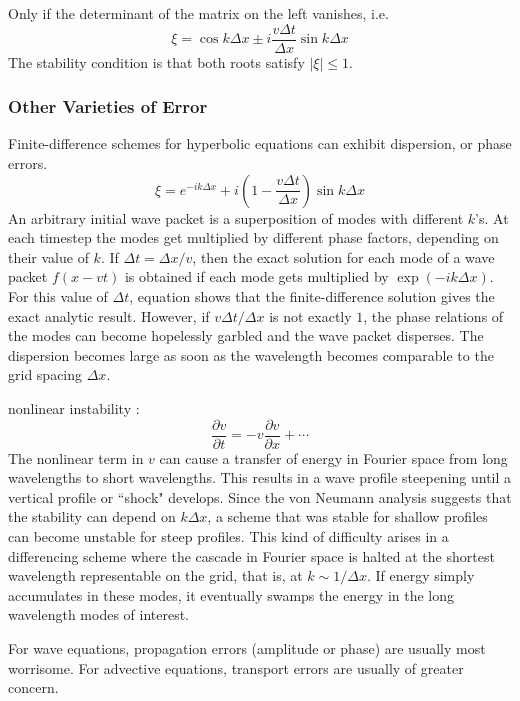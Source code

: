 \documentclass[12pt,a4paper]{article}
\begin{document}
Only if the determinant of the matrix on the left vanishes, i.e.
\begin{equation}
\xi = \cos k\Delta x \pm i \dfrac{v\Delta t }{\Delta x} \sin k\Delta x 
\end{equation}
The stability condition is that both roots satisfy $|\xi| \leqslant 1$.

\subsubsection{Other Varieties of Error}
Finite-difference schemes for hyperbolic equations can exhibit dispersion, or phase errors.
\begin{equation}
\xi = e^{-ik\Delta x} +i\left(1- \dfrac{v\Delta t }{\Delta x} \right) \sin k\Delta x 
\end{equation}
An arbitrary initial wave packet is a superposition of modes with different $k$'s. At each timestep the modes get multiplied by different phase factors, depending on their value of $k$.  If $\Delta t = \Delta x/v$, then the exact solution for each mode of a wave packet $f(x − vt)$ is obtained if each mode gets multiplied by $\exp(-ik\Delta x)$. For this value of $\Delta t$, equation shows that the finite-difference solution gives the exact analytic result. However, if $v \Delta t/\Delta x$ is not exactly $1$, the phase relations of the modes can become hopelessly garbled and the wave packet disperses. The dispersion becomes large as soon as the wavelength becomes comparable to the grid spacing $\Delta x$.

nonlinear instability : 
\begin{equation}
\frac{\partial v}{\partial t} = -v\frac{\partial v}{\partial x} +\cdots
\end{equation}
The nonlinear term in $v$ can cause a transfer of energy in Fourier space from long wavelengths to short wavelengths. This results in a wave profile steepening until a vertical profile or ``shock" develops. Since the von Neumann analysis suggests that the stability can depend on $k\Delta x$, a scheme that was stable for shallow profiles can become unstable for steep profiles. This kind of difficulty arises in a differencing scheme where the cascade in Fourier space is halted at the shortest wavelength representable on the grid, that is, at $k \sim 1/\Delta x$. If energy simply accumulates in these modes, it eventually swamps the energy in the long wavelength modes of interest.

For wave equations, propagation errors (amplitude or phase) are usually most worrisome. For advective equations, transport errors are usually of greater concern.
\end{document}
